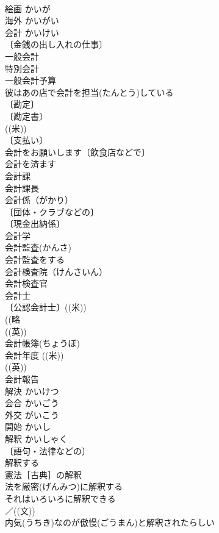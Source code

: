 \documentclass[8pt]{extreport}
\begin{document}
\begin{CJK}{UTF8}{min}
\\	絵画	かいが	
\\	海外	かいがい	
\\	会計	かいけい	
\\	〔金銭の出し入れの仕事〕
\\	一般会計 
\\	特別会計 
\\	一般会計予算 
\\	彼はあの店で会計を担当(たんとう)している 
\\	〔勘定〕
\\	〔勘定書〕
\\	((米)) 
\\	〔支払い〕
\\	会計をお願いします〔飲食店などで〕 
\\	会計を済ます 
\\	会計課 
\\	会計課長 
\\	会計係（がかり） 
\\	〔団体・クラブなどの〕
\\	〔現金出納係〕
\\	会計学 
\\	会計監査(かんさ) 
\\	会計監査をする 
\\	会計検査院（けんさいん） 
\\	会計検査官 
\\	会計士 
\\	〔公認会計士〕((米)) 
\\	((略
\\	((英)) 
\\	会計帳簿(ちょうぼ)
\\	会計年度 ((米)) 
\\	((英)) 
\\	会計報告 
\\	解決	かいけつ	
\\	会合	かいごう	
\\	外交	がいこう	
\\	開始	かいし	
\\	解釈	かいしゃく	
\\	〔語句・法律などの〕
\\	解釈する 
\\	憲法［古典］の解釈 
\\	法を厳密(げんみつ)に解釈する 
\\	それはいろいろに解釈できる 
\\	／((文)) 
\\	内気(うちき)なのが傲慢(ごうまん)と解釈されたらしい 

\end{CJK}
\end{document}
